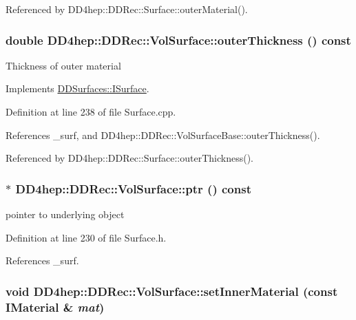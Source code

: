 Referenced by DD4hep::DDRec::Surface::outerMaterial().\hypertarget{class_d_d4hep_1_1_d_d_rec_1_1_vol_surface_abf78c6b50d2959a7e1f50ed36fc759f6}{
\subsubsection[{outerThickness}]{\setlength{\rightskip}{0pt plus 5cm}double DD4hep::DDRec::VolSurface::outerThickness () const}}
\label{class_d_d4hep_1_1_d_d_rec_1_1_vol_surface_abf78c6b50d2959a7e1f50ed36fc759f6}
Thickness of outer material 

Implements \hyperlink{class_d_d_surfaces_1_1_i_surface_aa2559a8904e474835c5d24c243a44909}{DDSurfaces::ISurface}.

Definition at line 238 of file Surface.cpp.

References \_\-surf, and DD4hep::DDRec::VolSurfaceBase::outerThickness().

Referenced by DD4hep::DDRec::Surface::outerThickness().\hypertarget{class_d_d4hep_1_1_d_d_rec_1_1_vol_surface_aed761d8bc4cf4b4d8f2b5e2bef8c0f7c}{
\subsubsection[{ptr}]{$\ast$ DD4hep::DDRec::VolSurface::ptr () const}}
\label{class_d_d4hep_1_1_d_d_rec_1_1_vol_surface_aed761d8bc4cf4b4d8f2b5e2bef8c0f7c}


pointer to underlying object 

Definition at line 230 of file Surface.h.

References \_\-surf.\hypertarget{class_d_d4hep_1_1_d_d_rec_1_1_vol_surface_a17eba889b8f154c12db6c82dd6769845}{
\subsubsection[{setInnerMaterial}]{\setlength{\rightskip}{0pt plus 5cm}void DD4hep::DDRec::VolSurface::setInnerMaterial (const {\bf IMaterial} \& {\em mat})}}
\label{class_d_d4hep_1_1_d_d_rec_1_1_vol_surface_a17eba889b8f154c12db6c82dd6769845}


